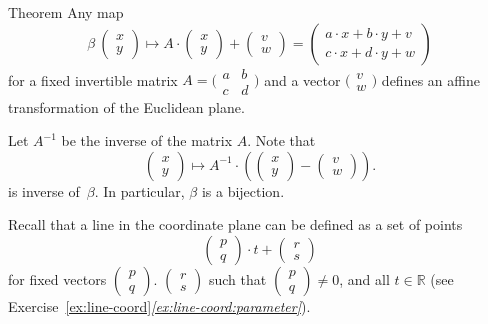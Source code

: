 \begin{thm}{Theorem}\label{thm:affine=linear}
Any map 
\[\beta\:\left(\begin{smallmatrix}
x\\ y
\end{smallmatrix} \right)
  \mapsto
  A
  \cdot
  \left(\begin{smallmatrix}
x\\ y
\end{smallmatrix} \right)
  +
\left(\begin{smallmatrix}
v\\ w
\end{smallmatrix} \right)
=\left(\begin{smallmatrix}
a\cdot x+b\cdot y+v\\ 
c\cdot x+d\cdot y+w 
\end{smallmatrix} \right)
\]
for a fixed invertible matrix $A=\bigl(\begin{smallmatrix}
a&b\\ c&d
\end{smallmatrix} \bigr)$ and a vector $\bigl(\begin{smallmatrix}
v\\ w
\end{smallmatrix} \bigr)$ defines an affine transformation of the Euclidean plane.
\end{thm}

Let $A^{-1}$ be the inverse of the matrix $A$.
Note that
\[\left(\begin{smallmatrix}
x\\ y
\end{smallmatrix} \right)
\mapsto
  A^{-1}
\cdot
\left((\begin{smallmatrix}
x\\ y
\end{smallmatrix} )
-
(\begin{smallmatrix}
v\\ w
\end{smallmatrix} )\right).
\] 
is inverse of~$\beta$.
In particular, $\beta$ is a bijection.

Recall that a line in the coordinate plane can be defined as a set of points 
\[\left(\begin{smallmatrix}p\\q
\end{smallmatrix} \right)\cdot t
+
\left(\begin{smallmatrix}r\\s
\end{smallmatrix} \right)\]
for fixed vectors $\left(\begin{smallmatrix}p\\q
\end{smallmatrix} \right)$. $\left(\begin{smallmatrix}r\\s
\end{smallmatrix}\right)$ such that $\left(\begin{smallmatrix}p\\q
\end{smallmatrix} \right)\ne 0$, and all $t\in\mathbb{R}$ (see Exercise~\ref{ex:line-coord}\textit{\ref{ex:line-coord:parameter}}).

